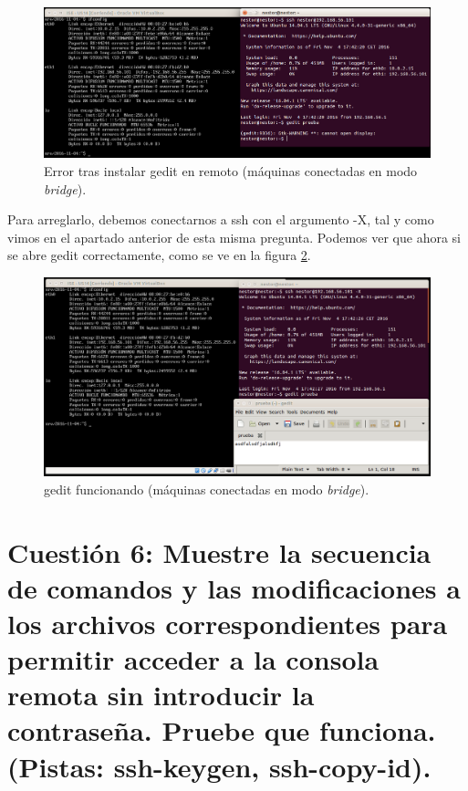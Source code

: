 \documentclass[a4paper,titlepage,12pt]{scrartcl}	%
\numberwithin{figure}{section} %
\numberwithin{table}{section} %
\begin{document}
	\begin{figure}[H]
		\includegraphics[width=\linewidth]{./Imagenes/5-errorgedit.png}
		\vspace{-0.5cm}
		\caption[Error tras instalar gedit en remoto (máquinas conectadas en modo \textit{bridge}).]{Error tras instalar gedit en remoto (máquinas conectadas en modo \textit{bridge}).}
		\label{5-errorgedit}
	\end{figure}
	
	Para arreglarlo, debemos conectarnos a ssh con el argumento -X, tal y como vimos en el apartado anterior de esta misma pregunta. Podemos ver que ahora si se abre gedit correctamente, como se ve en la figura \ref{5-geditfuncionando}.
	\begin{figure}[H]
		\includegraphics[width=\linewidth]{./Imagenes/5-geditfuncionando.png}
		\vspace{-0.5cm}
		\caption[gedit funcionando (máquinas conectadas en modo \textit{bridge}).]{gedit funcionando (máquinas conectadas en modo \textit{bridge}).}
		\label{5-geditfuncionando}
	\end{figure}
	
	\section[Cuestión 6: Muestre la secuencia de comandos y las modificaciones a los archivos correspondientes para permitir acceder a la consola remota sin introducir la contraseña. Pruebe que funciona. (Pistas: ssh-keygen, ssh-copy-id).]{Cuestión 6: Muestre la secuencia de comandos y las modificaciones a los archivos correspondientes para permitir acceder a la consola remota sin introducir la contraseña. Pruebe que funciona. (Pistas: ssh-keygen, ssh-copy-id).}
	
\end{document}
